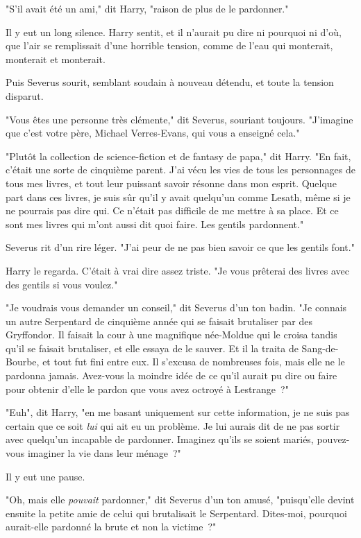 "S'il avait été un ami," dit Harry, "raison de plus de le pardonner."

Il y eut un long silence. Harry sentit, et il n'aurait pu dire ni pourquoi ni d'où, que l'air se remplissait d'une horrible tension, comme de l'eau qui monterait, monterait et monterait.

Puis Severus sourit, semblant soudain à nouveau détendu, et toute la tension disparut.

"Vous êtes une personne très clémente," dit Severus, souriant toujours. "J'imagine que c'est votre père, Michael Verres-Evans, qui vous a enseigné cela."

"Plutôt la collection de science-fiction et de fantasy de papa," dit Harry. "En fait, c'était une sorte de cinquième parent. J'ai vécu les vies de tous les personnages de tous mes livres, et tout leur puissant savoir résonne dans mon esprit. Quelque part dans ces livres, je suis sûr qu'il y avait quelqu'un comme Lesath, même si je ne pourrais pas dire qui. Ce n'était pas difficile de me mettre à sa place. Et ce sont mes livres qui m'ont aussi dit quoi faire. Les gentils pardonnent."

Severus rit d'un rire léger. "J'ai peur de ne pas bien savoir ce que les gentils font."

Harry le regarda. C'était à vrai dire assez triste. "Je vous prêterai des livres avec des gentils si vous voulez."

"Je voudrais vous demander un conseil," dit Severus d'un ton badin. "Je connais un autre Serpentard de cinquième année qui se faisait brutaliser par des Gryffondor. Il faisait la cour à une magnifique née-Moldue qui le croisa tandis qu'il se faisait brutaliser, et elle essaya de le sauver. Et il la traita de Sang-de-Bourbe, et tout fut fini entre eux. Il s'excusa de nombreuses fois, mais elle ne le pardonna jamais. Avez-vous la moindre idée de ce qu'il aurait pu dire ou faire pour obtenir d'elle le pardon que vous avez octroyé à Lestrange~?"

"Euh", dit Harry, "en me basant uniquement sur cette information, je ne suis pas certain que ce soit \emph{lui} qui ait eu un problème. Je lui aurais dit de ne pas sortir avec quelqu'un incapable de pardonner. Imaginez qu'ils se soient mariés, pouvez-vous imaginer la vie dans leur ménage~?"

Il y eut une pause.

"Oh, mais elle \emph{pouvait} pardonner," dit Severus d'un ton amusé, "puisqu'elle devint ensuite la petite amie de celui qui brutalisait le Serpentard. Dites-moi, pourquoi aurait-elle pardonné la brute et non la victime~?"

